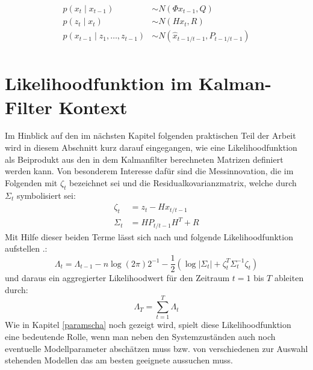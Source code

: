 \documentclass[12pt,a4paper,headsepline,bibliography=totoc,listof=totoc,headinclude=false,footinclude=false,BCOR5mm]{scrreprt} %
\begin{document}
 \begin{equation}\label{kalmbay}\begin{split}
p\left(x_{t}\mid x_{t-1}\right) & \sim N(\Phi x_{t-1},Q) \\
p\left(z_{t}\mid x_{t}\right) & \sim N(H x_{t},R) \\
p\left(x_{t-1}\mid z_{1}, \ldots, z_{t-1}\right) & \sim N(\hat{x}_{t-1/t-1},P_{t-1/t-1}) \\
\end{split} \end{equation} 

\section{Likelihoodfunktion im Kalman-Filter Kontext}
Im Hinblick auf den im n{\"a}chsten Kapitel folgenden praktischen Teil der Arbeit wird in diesem Abschnitt kurz darauf eingegangen, wie eine Likelihoodfunktion als Beiprodukt aus den in dem Kalmanfilter berechneten Matrizen definiert werden kann. Von besonderem Interesse daf{\"u}r sind die Messinnovation, die im Folgenden mit $\zeta_t$ bezeichnet sei und die Residualkovarianzmatrix, welche durch $\Sigma_t$ symbolisiert sei:
 \begin{equation}\label{like1}\begin{split}
\zeta_t & = z_t - H\hat{x}_{t/t-1} \\
\Sigma_t  &=  HP_{t/t-1}H^T + R
\end{split} \end{equation} 
Mit Hilfe dieser beiden Terme l{\"a}sst sich nach \cite[S. 34ff]{Bolder2001} und \cite[S. 9ff]{Duffee2004} folgende Likelihoodfunktion aufstellen \cite[S. 83ff.]{Mazzoni2007}.:
 \begin{equation}\label{like2}
\Lambda_t = \Lambda _{t-1} - n \log (2 \pi ) 2^{-1}- \frac{1}{2} \left(\log \left|\Sigma_t\right| +\zeta_{t}^{T}\Sigma_{t}^{-1}\zeta_{t}\right) 
 \end{equation} und daraus ein aggregierter Likelihoodwert f{\"u}r den Zeitraum $t = 1$ bis $T$ ableiten durch:
 \begin{equation}\label{like3}
\Lambda _T = \sum_{t=1}^{T} \Lambda _t 
 \end{equation}
Wie in Kapitel \ref{paramscha} noch gezeigt wird, spielt diese Likelihoodfunktion eine bedeutende Rolle, wenn man neben den Systemzust{\"a}nden auch noch eventuelle Modellparameter absch\"atzen muss bzw. von verschiedenen zur Auswahl stehenden Modellen das am besten geeignete aussuchen muss.
\end{document}
